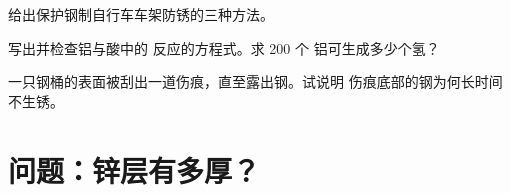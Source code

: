 \begin{exercise}[$\star\star$]\label{exo:g9:metals-acids-corrosion:10}
给出保护钢制自行车车架防锈的三种方法。
\end{exercise}

\begin{exercise}[$\star\star\star$]\label{exo:g9:metals-acids-corrosion:11}
写出并检查铝与酸中的
 反应的方程式。求 200 个
铝可生成多少个氢？
\end{exercise}

\begin{exercise}[$\star\star\star$]\label{exo:g9:metals-acids-corrosion:12}
一只钢桶的表面被刮出一道伤痕，直至露出钢。试说明
伤痕底部的钢为何长时间不生锈。
\end{exercise}

\section{问题：锌层有多厚？}

